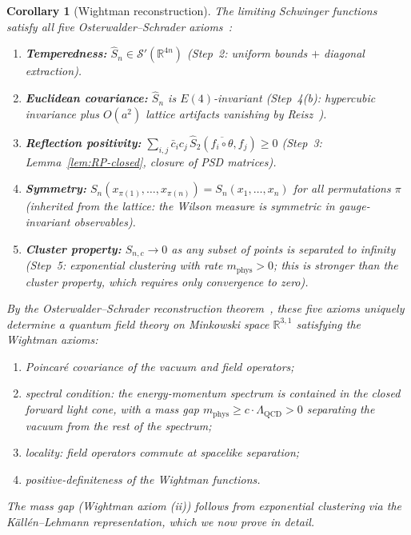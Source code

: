 \documentclass[11pt]{article}
\newtheorem{corollary}[theorem]{Corollary}
\theoremstyle{definition}
\newcommand{\R}{\mathbb{R}}
\newcommand{\Lam}{\Lambda_{\mathrm{QCD}}}
\begin{document}
\begin{corollary}[Wightman reconstruction]\label{cor:wightman}
The limiting Schwinger functions satisfy all five
Osterwalder--Schrader axioms~\cite{OS73}:

\begin{enumerate}[nosep,label=(OS\arabic*)]
\item \textbf{Temperedness:} $\hat S_n\in\mathcal{S}'(\R^{4n})$
(Step~2: uniform bounds $+$ diagonal extraction).
\item \textbf{Euclidean covariance:} $\hat S_n$ is $E(4)$-invariant
(Step~4(b): hypercubic invariance plus $O(a^2)$ lattice
artifacts vanishing by Reisz~\cite{Reisz1988}).
\item \textbf{Reflection positivity:}
$\sum_{i,j}\bar c_i c_j\,\hat S_2(\overline{f_i\circ\theta},f_j)\ge 0$
(Step~3: Lemma~\ref{lem:RP-closed}, closure of PSD matrices).
\item \textbf{Symmetry:} $S_n(x_{\pi(1)},\ldots,x_{\pi(n)})
=S_n(x_1,\ldots,x_n)$ for all permutations $\pi$
(inherited from the lattice: the Wilson measure is symmetric
in gauge-invariant observables).
\item \textbf{Cluster property:} $S_{n,c}\to 0$ as any
subset of points is separated to infinity
(Step~5: exponential clustering with rate $m_{\mathrm{phys}}>0$;
this is stronger than the cluster property, which
requires only convergence to zero).
\end{enumerate}

By the Osterwalder--Schrader reconstruction
theorem~\cite{OS73}, these five axioms uniquely determine
a quantum field theory on Minkowski space $\R^{3,1}$
satisfying the Wightman axioms:
\begin{enumerate}[nosep,label=(\roman*)]
\item Poincar\'e covariance of the vacuum and field operators;
\item spectral condition: the energy-momentum spectrum is contained in
the closed forward light cone, with a mass gap $m_{\mathrm{phys}}
\ge c\cdot\Lam>0$ separating the vacuum from the rest of the spectrum;
\item locality: field operators commute at spacelike separation;
\item positive-definiteness of the Wightman functions.
\end{enumerate}

The mass gap (Wightman axiom (ii)) follows from exponential
clustering via the K\"all\'en--Lehmann representation, which we
now prove in detail.
\end{corollary}
\end{document}
